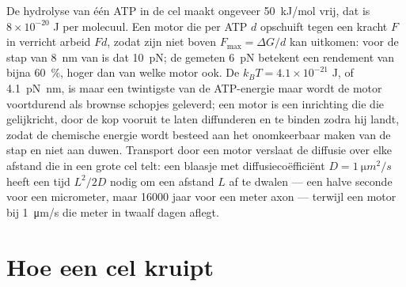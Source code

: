 \begin{proposition}\label{prop:b3:cytoskeleton-motility:physics}
De hydrolyse van één ATP in de cel maakt ongeveer \qty{50}{kJ/mol}
vrij, dat is $8\times 10^{-20}$ J per molecuul. Een motor die per ATP
$d$ opschuift tegen een kracht $F$ in verricht arbeid $Fd$, zodat zijn
\emph{} niet boven $F_{\max} = \Delta G/d$ kan uitkomen:
voor de stap van \qty{8}{nm} van  is dat \qty{10}{pN}; de
gemeten \qty{6}{pN} betekent een rendement van bijna \qty{60}{\%},
hoger dan van welke motor ook. De  $k_{B}T =
4.1\times 10^{-21}$ J, of \qty{4.1}{pN.nm}, is maar een twintigste van
de ATP-energie maar wordt de motor voortdurend als brownse schopjes
geleverd; een motor is een inrichting die die gelijkricht, door de kop
vooruit te laten diffunderen en te binden zodra hij landt, zodat de
chemische energie wordt besteed aan het onomkeerbaar maken van de stap
en niet aan duwen. Transport door een motor verslaat de diffusie over
elke afstand die in een grote cel telt: een blaasje met
diffusiecoëfficiënt $D = \qty{1}{\micro
m^2/s}$ heeft een tijd $L^{2}/2D$ nodig om een afstand $L$ af te
dwalen --- een halve seconde voor een micrometer, maar \num{16000} jaar
voor een meter axon --- terwijl een motor bij \qty{1}{\micro m/s} die
meter in twaalf dagen aflegt.
\end{proposition}
\admitted

\section{Hoe een cel kruipt}

